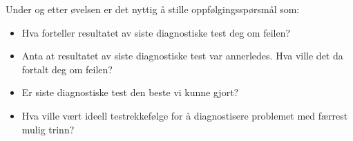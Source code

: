 Under og etter øvelsen er det nyttig å stille oppfølgingsspørsmål som:

\begin{itemize}
\item{} Hva forteller resultatet av siste diagnostiske test deg om feilen?
\item{} Anta at resultatet av siste diagnostiske test var annerledes. Hva ville det da fortalt deg om feilen?
\item{} Er siste diagnostiske test den beste vi kunne gjort?
\item{} Hva ville vært ideell testrekkefølge for å diagnostisere problemet med færrest mulig trinn?
\end{itemize}


